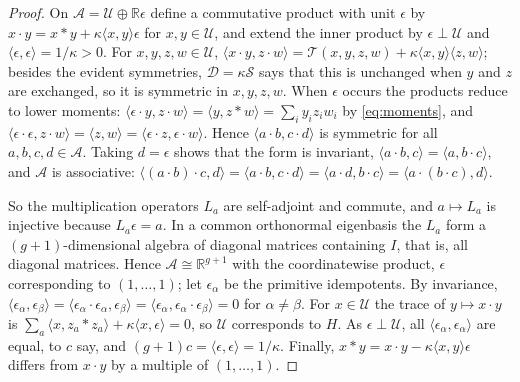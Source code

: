 \documentclass[11pt]{article}
\theoremstyle{definition}
\theoremstyle{remark}
\newcommand{\ip}[2]{\langle #1,#2\rangle}
\begin{document}
\begin{proof}
On $\mathcal A=\mathcal U\oplus\mathbb R\epsilon$ define a commutative product
with unit $\epsilon$ by $x\cdot y=x*y+\kappa\ip xy\epsilon$ for
$x,y\in\mathcal U$, and extend the inner product by $\epsilon\perp\mathcal U$
and $\ip\epsilon\epsilon=1/\kappa>0$. For $x,y,z,w\in\mathcal U$,
$\ip{x\cdot y}{z\cdot w}=\mathcal T(x,y,z,w)+\kappa\ip xy\ip zw$; besides the
evident symmetries, $\mathcal D=\kappa\mathcal S$ says that this is unchanged
when $y$ and $z$ are exchanged, so it is symmetric in $x,y,z,w$. When $\epsilon$
occurs the products reduce to lower moments: $\ip{\epsilon\cdot y}{z\cdot w}
=\ip{y}{z*w}=\sum_iy_iz_iw_i$ by \eqref{eq:moments}, and
$\ip{\epsilon\cdot\epsilon}{z\cdot w}=\ip zw=\ip{\epsilon\cdot z}{\epsilon\cdot w}$.
Hence $\ip{a\cdot b}{c\cdot d}$ is symmetric for all $a,b,c,d\in\mathcal A$.
Taking $d=\epsilon$ shows that the form is invariant,
$\ip{a\cdot b}c=\ip a{b\cdot c}$, and $\mathcal A$ is associative:
$\ip{(a\cdot b)\cdot c}d=\ip{a\cdot b}{c\cdot d}=\ip{a\cdot d}{b\cdot c}
=\ip{a\cdot(b\cdot c)}d$.

So the multiplication operators $L_a$ are self-adjoint and commute, and
$a\mapsto L_a$ is injective because $L_a\epsilon=a$. In a common orthonormal
eigenbasis the $L_a$ form a $(g+1)$-dimensional algebra of diagonal matrices
containing $I$, that is, all diagonal matrices. Hence $\mathcal A\cong\mathbb
R^{g+1}$ with the coordinatewise product, $\epsilon$ corresponding to
$(1,\dots,1)$; let $\epsilon_\alpha$ be the primitive idempotents. By
invariance,
$\ip{\epsilon_\alpha}{\epsilon_\beta}=\ip{\epsilon_\alpha\cdot\epsilon_\alpha}{\epsilon_\beta}
=\ip{\epsilon_\alpha}{\epsilon_\alpha\cdot\epsilon_\beta}=0$ for
$\alpha\ne\beta$. For $x\in\mathcal U$ the trace of $y\mapsto x\cdot y$ is
$\sum_a\ip x{z_a*z_a}+\kappa\ip x\epsilon=0$, so $\mathcal U$ corresponds to
$H$. As $\epsilon\perp\mathcal U$, all $\ip{\epsilon_\alpha}{\epsilon_\alpha}$
are equal, to $c$ say, and $(g+1)c=\ip\epsilon\epsilon=1/\kappa$. Finally,
$x*y=x\cdot y-\kappa\ip xy\epsilon$ differs from $x\cdot y$ by a multiple of
$(1,\dots,1)$.
\end{proof}
\end{document}
